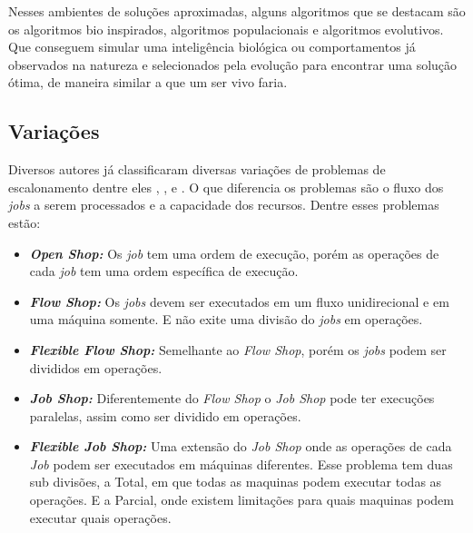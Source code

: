         Nesses ambientes de soluções aproximadas, alguns algoritmos que se destacam são os algoritmos bio inspirados, algoritmos populacionais e algoritmos evolutivos. Que conseguem simular uma inteligência biológica ou comportamentos já observados na natureza e selecionados pela evolução para encontrar uma solução ótima, de maneira similar a que um ser vivo faria.


    \subsection{Variações}
        Diversos autores já classificaram diversas variações de problemas de escalonamento dentre eles \cite{graham1979}, \cite{Lenstra1979}, e \cite{maccarthy1993}. O que diferencia os problemas são o fluxo dos \textit{jobs} a serem processados e a capacidade dos recursos. Dentre esses problemas estão:
        \begin{itemize}
            \item \textbf{\textit{Open Shop:}} Os \textit{job} tem uma ordem de execução, porém as operações de cada \textit{job} tem uma ordem específica de execução.
            
            \item \textbf{\textit{Flow Shop:}} Os \textit{jobs} devem ser executados em um fluxo unidirecional e em uma máquina somente. E não exite uma divisão do \textit{jobs} em operações.
            
            \item \textbf{\textit{Flexible Flow Shop:}} Semelhante ao \textit{Flow Shop}, porém os \textit{jobs} podem ser divididos em operações.
            
            \item \textbf{\textit{Job Shop:}} Diferentemente do \textit{Flow Shop} o \textit{Job Shop} pode ter execuções paralelas, assim como ser dividido em operações.
            
            \item \textbf{\textit{Flexible Job Shop:}} Uma extensão do \textit{Job Shop} onde as operações de cada \textit{Job} podem ser executados em máquinas diferentes. Esse problema tem duas sub divisões, a Total, em que todas as maquinas podem executar todas as operações. E a Parcial, onde existem limitações para quais maquinas podem executar quais operações.
        \end{itemize}

